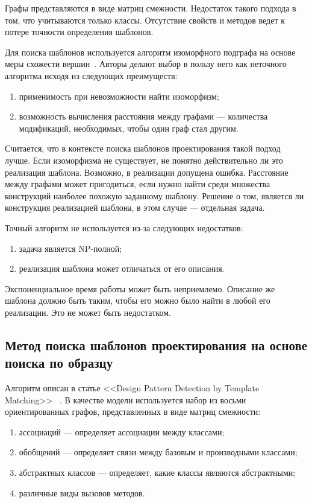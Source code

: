 Графы представляются в виде матриц смежности.
Недостаток такого подхода в том, что учитываются только классы.
Отсутствие свойств и методов ведет к потере точности определения шаблонов.

Для поиска шаблонов используется алгоритм изоморфного подграфа на основе меры
схожести вершин~\cite{SimilarityGraphVertices}.
Авторы делают выбор в пользу него как неточного алгоритма исходя из следующих
преимуществ:
\begin{enumerate}
\item применимость при невозможности найти изоморфизм;
\item возможность вычисления расстояния между графами --- количества модификаций,
необходимых, чтобы один граф стал другим.
\end{enumerate}

Считается, что в контексте поиска шаблонов проектирования такой подход лучше.
Если изоморфизма не существует, не понятно действительно ли это реализация шаблона.
Возможно, в реализации допущена ошибка.
Расстояние между графами может пригодиться, если нужно найти среди множества
конструкций наиболее похожую заданному шаблону.
Решение о том, является ли конструкция реализацией шаблона, в этом случае ---
отдельная задача.

Точный алгоритм не используется из-за следующих недостатков:
\begin{enumerate}
\item задача является NP-полной;
\item реализация шаблона может отличаться от его описания.
\end{enumerate}

Экспоненциальное время работы может быть неприемлемо.
Описание же шаблона должно быть таким, чтобы его можно было найти в любой его
реализации. Это не может быть недостатком.

\subsection{Метод поиска шаблонов проектирования на основе поиска по образцу}

Алгоритм описан в статье <<Design Pattern Detection by Template Matching>>
~\cite{DesignPatternTemplateMatching}.
В качестве модели используется набор из восьми ориентированных графов,
представленных в виде матриц смежности:
\begin{enumerate}
\item ассоциаций --- определяет ассоциации между классами;
\item обобщений --- определяет связи между базовым и производными классами;
\item абстрактных классов --- определяет, какие классы являются абстрактными;
\item различные виды вызовов методов.
\end{enumerate}


